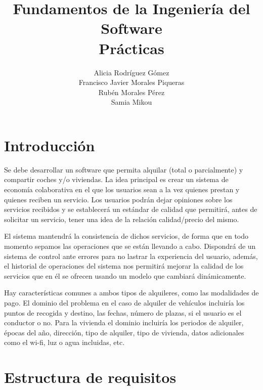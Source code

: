 \documentclass[11pt,spanish]{article} %
\title{Fundamentos de la Ingeniería del Software \\ Prácticas}
\author{Alicia Rodríguez Gómez \\ Francisco Javier Morales Piqueras\\ Rubén Morales Pérez\\ Samia Mikou}
\date{ }
\begin{document}
\maketitle
\tableofcontents %
\newpage
\setlength\parindent{0pt} %


\section{Introducción}
Se debe desarrollar un software que permita alquilar (total o parcialmente) y compartir coches y/o viviendas. 
La idea principal es crear un sistema de economía colaborativa en el que los usuarios sean a la vez quienes prestan y quienes reciben un servicio. Los usuarios podrán dejar opiniones sobre los servicios recibidos y se establecerá un estándar de calidad que permitirá, antes de solicitar un servicio, tener una idea de la relación calidad/precio del mismo.

El sistema mantendrá la consistencia de dichos servicios, de forma que en todo momento sepamos las operaciones que se están llevando a cabo.
Dispondrá de un sistema de control ante errores para no lastrar la experiencia del usuario, además, el historial de operaciones del sistema nos permitirá mejorar la calidad de los servicios que en él se ofrecen usando un modelo que cambiará dinámicamente.

Hay características comunes a ambos tipos de alquileres, como las modalidades de pago.
El dominio del problema en el caso de alquiler de vehículos incluiría los puntos de recogida y destino, las fechas, número de plazas, si el usuario es el conductor o no.
Para la vivienda el dominio incluiría los periodos de alquiler, épocas del año, dirección, tipo de alquiler, tipo de vivienda, datos adicionales como el wi-fi, luz o agua incluidas, etc.


\section{Estructura de requisitos}
\end{document}
